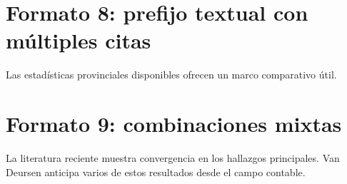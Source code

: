 \documentclass{article}
\begin{document}
\section{Formato 8: prefijo textual con múltiples citas}
Las estadísticas provinciales disponibles \autocite{2566-CEPAL2021,2565-HARGITTAI2002} ofrecen un marco comparativo útil.


\section{Formato 9: combinaciones mixtas}
La literatura reciente \autocite{2562-WARSCHAUER2004,2563-VANDIJK2020,2566-CEPAL2021} muestra convergencia en los hallazgos principales. Van Deursen \autocite{2564-VANDEURSEN2019} anticipa varios de estos resultados desde el campo contable.



\printbibliography
\end{document}
